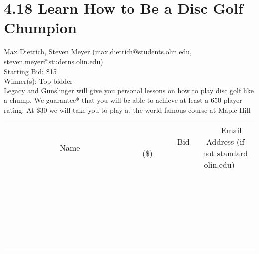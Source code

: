 \documentclass[11pt]{article}
\begin{document}
\section*{4.18 Learn How to Be a Disc Golf Chumpion}
Max Dietrich, Steven Meyer (max.dietrich@students.olin.edu, steven.meyer@studetns.olin.edu) \\
Starting Bid: \$15 \\
Winner(s): 
Top bidder \\
Legacy and Gunslinger will give you personal lessons on how to play disc golf like a chump.  We guarantee* that you will be able to achieve at least a 650 player rating.  At \$30 we will take you to play at the world famous course at Maple Hill \\[6ex]
\begin{tabular}{c c c}
~~~~~~~~~~~~~Name~~~~~~~~~~~~~ & ~~~~~~~~~Bid (\$)~~~~~~~~~ & ~~~Email Address (if not standard olin.edu)~~~ \\
 & & \\
\hline
 & & \\
\hline
 & & \\
\hline
 & & \\
\hline
 & & \\
\hline
 & & \\
\hline
 & & \\
\hline
 & & \\
\hline
 & & \\
\hline
 & & \\
\hline
 & & \\
\hline
 & & \\
\hline
 & & \\
\hline
 & & \\
\hline
 & & \\
\hline
 & & \\
\hline
 & & \\
\hline
 & & \\
\hline
 & & \\
\hline
 & & \\
\hline
 & & \\
\hline
 & & \\
\hline
 & & \\
\hline
 & & \\
\hline
 & & \\
\hline
 & & \\
\hline
\end{tabular}
\clearpage
\end{document}

